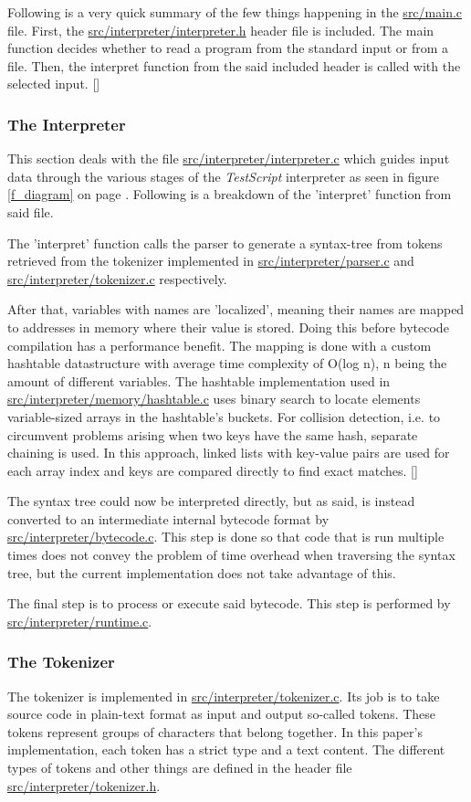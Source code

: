 \documentclass[12pt,a4paper]{article}
\newcommand{\hrc}[1]{\hyperref[#1]{#1}}
\newcommand{\name}{\emph{TestScript}}
\begin{document}
Following is a very quick summary of the few 
things happening in the \hrc{src/main.c} file.
First, the \hrc{src/interpreter/interpreter.h} header file is included. 
The main function decides whether to
read a program from the standard input or from a file. 
Then, the interpret function
from the said included header is called with the selected input.
[]

\subsubsection{The Interpreter}
This section deals with the file 
\hrc{src/interpreter/interpreter.c} which guides
input data through the various stages of the \name{} interpreter as 
seen in figure \ref{f_diagram} on page \pageref{f_diagram}.
Following is a breakdown of the 'interpret' function from said file.

The 'interpret' function calls the parser to generate a syntax-tree from tokens retrieved
from the tokenizer implemented in \hrc{src/interpreter/parser.c} and 
\hrc{src/interpreter/tokenizer.c} respectively.

After that, variables with names are 'localized', meaning their names are
mapped to addresses in memory where their value is stored. Doing this before
bytecode compilation has a performance benefit. 
The mapping is done with a custom hashtable datastructure with average time
complexity of O(log n), n being the amount of different variables.
The hashtable implementation used in \hrc{src/interpreter/memory/hashtable.c}
uses binary search to locate elements variable-sized arrays in the hashtable's buckets.
For collision detection, i.e. to circumvent problems arising when two keys have the
same hash, separate chaining is used. In this approach, linked lists with
key-value pairs are used for each array index and keys are compared directly
to find exact matches.
[]

The syntax tree could now be interpreted directly, but as said, is instead converted
to an intermediate internal bytecode format by \hrc{src/interpreter/bytecode.c}.
This step is done so that code that is run multiple times does not convey
the problem of time overhead when traversing the syntax tree, but the current
implementation does not take advantage of this.

The final step is to process or execute said bytecode. This step is performed
by \hrc{src/interpreter/runtime.c}.

\subsubsection{The Tokenizer}
The tokenizer is implemented in \hrc{src/interpreter/tokenizer.c}. Its job is to
take source code in plain-text format as input and output so-called tokens.
These tokens represent groups of characters that belong together. In this paper's
implementation, each token has a strict type and a text content.
The different types of tokens and other things are defined in the header file
\hrc{src/interpreter/tokenizer.h}.
\end{document}
